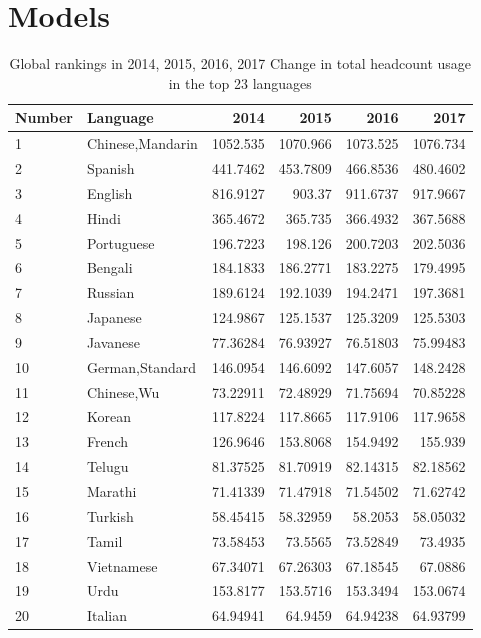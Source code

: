 \section{Models}

\begin{table}[H]
	\centering
	\caption{Global rankings in 2014, 2015, 2016, 2017 Change in total headcount usage in the top 23 languages}
	\begin{tabular}{llrrrr}
		\toprule
		\multicolumn{1}{l}{Number} & Language & 2014  & 2015  & 2016  & 2017 \\
		\midrule
		1     & Chinese,Mandarin & 1052.535 & 1070.966 & 1073.525 & 1076.734 \\
		2     & Spanish & 441.7462 & 453.7809 & 466.8536 & 480.4602 \\
		3     & English & 816.9127 & 903.37 & 911.6737 & 917.9667 \\
		4     & Hindi & 365.4672 & 365.735 & 366.4932 & 367.5688 \\
		5     & Portuguese & 196.7223 & 198.126 & 200.7203 & 202.5036 \\
		6     & Bengali & 184.1833 & 186.2771 & 183.2275 & 179.4995 \\
		7     & Russian & 189.6124 & 192.1039 & 194.2471 & 197.3681 \\
		8     & Japanese & 124.9867 & 125.1537 & 125.3209 & 125.5303 \\
		9     & Javanese & 77.36284 & 76.93927 & 76.51803 & 75.99483 \\
		10    & German,Standard & 146.0954 & 146.6092 & 147.6057 & 148.2428 \\
		11    & Chinese,Wu & 73.22911 & 72.48929 & 71.75694 & 70.85228 \\
		12    & Korean & 117.8224 & 117.8665 & 117.9106 & 117.9658 \\
		13    & French & 126.9646 & 153.8068 & 154.9492 & 155.939 \\
		14    & Telugu & 81.37525 & 81.70919 & 82.14315 & 82.18562 \\
		15    & Marathi & 71.41339 & 71.47918 & 71.54502 & 71.62742 \\
		16    & Turkish & 58.45415 & 58.32959 & 58.2053 & 58.05032 \\
		17    & Tamil & 73.58453 & 73.5565 & 73.52849 & 73.4935 \\
		18    & Vietnamese & 67.34071 & 67.26303 & 67.18545 & 67.0886 \\
		19    & Urdu  & 153.8177 & 153.5716 & 153.3494 & 153.0674 \\
		20    & Italian & 64.94941 & 64.9459 & 64.94238 & 64.93799 \\
		\bottomrule
	\end{tabular}%
	\label{tab:addlabel}%
\end{table}%

